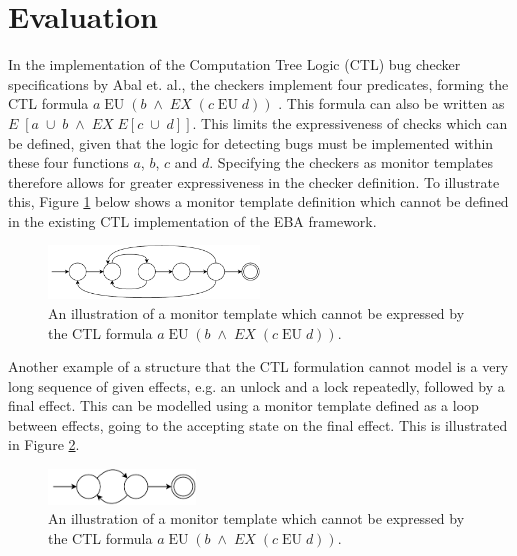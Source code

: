 \section{Evaluation}

In the implementation of the Computation Tree Logic (CTL) bug checker specifications by Abal et. al., the checkers implement four predicates, forming the CTL formula $a\;\text{EU}\;(b\;\land\;EX\;(c\;\text{EU}\;d))$ \cite{Abal2017EffectiveBF}\cite{research-project}. This formula can also be written as $E\;[a\;\cup\;b\;\land\;EX\;E[c\;\cup\;d]]$. This limits the expressiveness of checks which can be defined, given that the logic for detecting bugs must be implemented within these four functions $a$, $b$, $c$ and $d$. Specifying the checkers as monitor templates therefore allows for greater expressiveness in the checker definition. To illustrate this, Figure \ref{expressive-monitor} below shows a monitor template definition which cannot be defined in the existing CTL implementation of the EBA framework. 

\begin{figure}[H]
    \centering
    \includegraphics[width=0.5\textwidth]{evaluation/figures/monitor}
    \caption{An illustration of a monitor template which cannot be expressed by the CTL formula $a\;\text{EU}\;(b\;\land\;EX\;(c\;\text{EU}\;d))$.}
    \label{expressive-monitor}
\end{figure}

\newpar Another example of a structure that the CTL formulation cannot model is a very long sequence of given effects, e.g. an unlock and a lock repeatedly, followed by a final effect. This can be modelled using a monitor template defined as a loop between effects, going to the accepting state on the final effect. This is illustrated in Figure \ref{long-monitor}. 

\begin{figure}[H]
    \centering
    \includegraphics[width=0.35\textwidth]{evaluation/figures/long-monitor}
    \caption{An illustration of a monitor template which cannot be expressed by the CTL formula $a\;\text{EU}\;(b\;\land\;EX\;(c\;\text{EU}\;d))$.}
    \label{long-monitor}
\end{figure}

